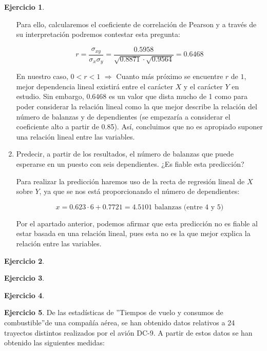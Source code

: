\documentclass[a4paper, 12pt]{article}
\theoremstyle{definition}
\newtheorem{ej}{Ejercicio}
\begin{document}
\begin{ej}
\begin{enumerate}[label=\alph*)]
Para ello, calcularemos el coeficiente de correlación de Pearson y a través de su interpretación podremos contestar esta pregunta:

\[
    r = \frac{\sigma_{xy}}{\sigma_x \sigma_y} = \frac{0.5958}{\sqrt{0.8871}\cdot\sqrt{0.9564}} = 0.6468
\]

En nuestro caso, $0 < r < 1$ $\Rightarrow$ Cuanto más próximo se encuentre $r$ de $1$, mejor dependencia lineal existirá entre el carácter $X$ y el carácter $Y$ en estudio. Sin embargo, 0.6468 es un valor que dista mucho de 1 como para poder considerar la relación lineal como la que mejor describe la relación del número de balanzas y de dependientes (se empezaría a considerar el coeficiente alto a partir de 0.85). Así, concluimos que no es apropiado suponer una relación lineal entre las variables.

\item Predecir, a partir de los resultados, el número de balanzas que puede esperarse en un puesto
con seis dependientes. ¿Es fiable esta predicción?

Para realizar la predicción haremos uso de la recta de regresión lineal de $X$ sobre $Y$, ya que se nos está proporcionando el número de dependientes:

\[
    x = 0.623 \cdot 6 + 0.7721 = 4.5101 \text{ balanzas (entre 4 y 5)}
\]

Por el apartado anterior, podemos afirmar que esta predicción no es fiable al estar basada en una relación lineal, pues esta no es la que mejor explica la relación entre las variables.
\end{enumerate}
\end{ej}

\begin{ej}

\end{ej}

\begin{ej}

\end{ej}

\begin{ej}

\end{ej}

\begin{ej}
De las estadísticas de ”Tiempos de vuelo y consumos de combustible”de una compañía aérea, se
han obtenido datos relativos a 24 trayectos distintos realizados por el avión DC-9. A partir de
estos datos se han obtenido las siguientes medidas:
\end{ej}
\end{document}
